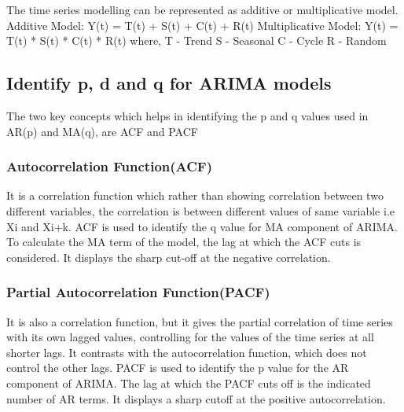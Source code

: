 \documentclass{article}
\begin{document}
The time series modelling can be represented as additive or multiplicative model.
Additive Model:\linebreak
Y(t) = T(t) + S(t) + C(t) + R(t)\linebreak
\linebreak
Multiplicative Model:\linebreak
Y(t) = T(t) * S(t) * C(t) * R(t)\linebreak
\linebreak
where,\linebreak
T - Trend\linebreak
S - Seasonal\linebreak
C - Cycle\linebreak
R - Random\linebreak

\subsection{Identify p, d and q for ARIMA models}
	
	The two key concepts which helps in identifying the p and q values used in AR(p) and MA(q), are ACF and PACF
	
	\subsubsection{Autocorrelation Function(ACF)}
	It is a correlation function which rather than showing correlation between two different variables, the correlation is between different values of same variable i.e Xi and Xi+k.\linebreak
	ACF is used to identify the q value for MA component of ARIMA. To calculate the MA term of the model, the lag at which the ACF cuts is considered. It displays the sharp cut-off at the negative correlation.

	
\subsubsection{Partial Autocorrelation Function(PACF)}

It is also a correlation function, but it gives the partial correlation of time series with its own lagged values, controlling for the values of the time series at all shorter lags. It contrasts with the autocorrelation function, which does not control the other lags.\linebreak
PACF is used to identify the p value for the AR component of ARIMA.
The lag at which the PACF cuts off is the indicated number of AR terms. It displays a sharp cutoff at the positive autocorrelation.
\end{document}
